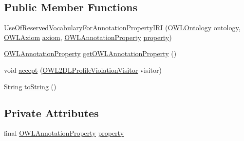 \subsection*{Public Member Functions}
\begin{DoxyCompactItemize}
\item 
\hyperlink{classorg_1_1semanticweb_1_1owlapi_1_1profiles_1_1_use_of_reserved_vocabulary_for_annotation_property_i_r_i_a06a1923956dbf4199d4dae428c98c65c}{Use\-Of\-Reserved\-Vocabulary\-For\-Annotation\-Property\-I\-R\-I} (\hyperlink{interfaceorg_1_1semanticweb_1_1owlapi_1_1model_1_1_o_w_l_ontology}{O\-W\-L\-Ontology} ontology, \hyperlink{interfaceorg_1_1semanticweb_1_1owlapi_1_1model_1_1_o_w_l_axiom}{O\-W\-L\-Axiom} \hyperlink{classorg_1_1semanticweb_1_1owlapi_1_1profiles_1_1_o_w_l_profile_violation_aa7c8e8910ed3966f64a2c003fb516214}{axiom}, \hyperlink{interfaceorg_1_1semanticweb_1_1owlapi_1_1model_1_1_o_w_l_annotation_property}{O\-W\-L\-Annotation\-Property} \hyperlink{classorg_1_1semanticweb_1_1owlapi_1_1profiles_1_1_use_of_reserved_vocabulary_for_annotation_property_i_r_i_ac7dd6689c9e916059fd1ee459944aa87}{property})
\item 
\hyperlink{interfaceorg_1_1semanticweb_1_1owlapi_1_1model_1_1_o_w_l_annotation_property}{O\-W\-L\-Annotation\-Property} \hyperlink{classorg_1_1semanticweb_1_1owlapi_1_1profiles_1_1_use_of_reserved_vocabulary_for_annotation_property_i_r_i_aa1c6c7e8cea2806142dbcdf476fd1572}{get\-O\-W\-L\-Annotation\-Property} ()
\item 
void \hyperlink{classorg_1_1semanticweb_1_1owlapi_1_1profiles_1_1_use_of_reserved_vocabulary_for_annotation_property_i_r_i_a968032393db7d46bc64eab5309ffb6e5}{accept} (\hyperlink{interfaceorg_1_1semanticweb_1_1owlapi_1_1profiles_1_1_o_w_l2_d_l_profile_violation_visitor}{O\-W\-L2\-D\-L\-Profile\-Violation\-Visitor} visitor)
\item 
String \hyperlink{classorg_1_1semanticweb_1_1owlapi_1_1profiles_1_1_use_of_reserved_vocabulary_for_annotation_property_i_r_i_a57327fc8f1072d494dc3b464bc1cf80b}{to\-String} ()
\end{DoxyCompactItemize}
\subsection*{Private Attributes}
\begin{DoxyCompactItemize}
\item 
final \hyperlink{interfaceorg_1_1semanticweb_1_1owlapi_1_1model_1_1_o_w_l_annotation_property}{O\-W\-L\-Annotation\-Property} \hyperlink{classorg_1_1semanticweb_1_1owlapi_1_1profiles_1_1_use_of_reserved_vocabulary_for_annotation_property_i_r_i_ac7dd6689c9e916059fd1ee459944aa87}{property}
\end{DoxyCompactItemize}


